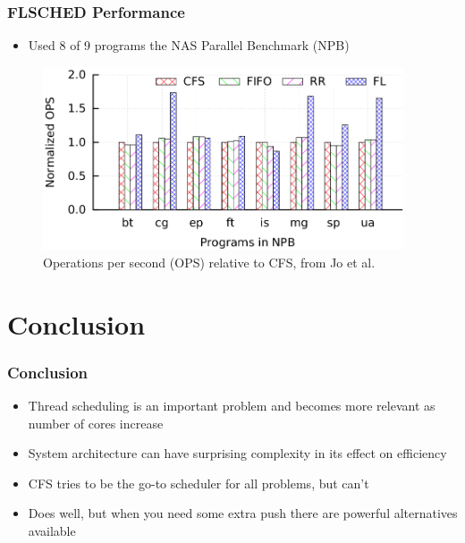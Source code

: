 \documentclass{beamer}
\newcommand{\linespace}{\vskip 0.25cm}
\begin{document}
\begin{frame}
\frametitle{FLSCHED Performance}
\begin{itemize}

\item Used 8 of 9 programs the NAS Parallel Benchmark (NPB) 

\end{itemize}
\begin{figure}
\caption*{Operations per second (OPS) relative to CFS, from Jo et al.~\cite{Jo:2017}}
\centering
\includegraphics[width=0.95\textwidth]{Illustrations/FLSCHED_OPS.png}
\end{figure}
\end{frame}

\section[Conclusion]{Conclusion}

\begin{frame}
\frametitle{Conclusion}

\begin{itemize}
\item Thread scheduling is an important problem and becomes more relevant as number of cores increase

\linespace

\item System architecture can have surprising complexity in its effect on efficiency

\linespace

\item CFS tries to be the go-to scheduler for all problems, but can't

\item Does well, but when you need some extra push there are powerful alternatives available

\end{itemize}
\end{frame}
\end{document}
